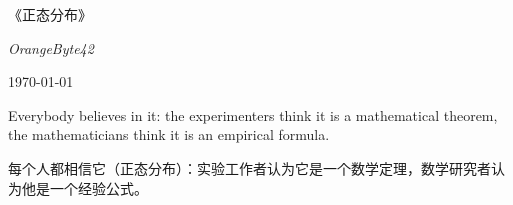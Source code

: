 \begin{titlepage}
    \centering
    {\Huge 《正态分布》 \par}\vspace{2em}
    {\Large \textit{OrangeByte42} \par}\vspace{1em}
    {\today \par}\vspace{4em}
    \parbox{\textwidth}{\noindent\small
        \textrm{Everybody believes in it: the experimenters think it is a mathematical theorem, the mathematicians think it is an empirical formula.}

        \hfill{}
    }\vspace{2em}
    \parbox{\textwidth}{\noindent\small
        每个人都相信它（正态分布）：实验工作者认为它是一个数学定理，数学研究者认为他是一个经验公式。

        \hfill{}
    }
\end{titlepage}



